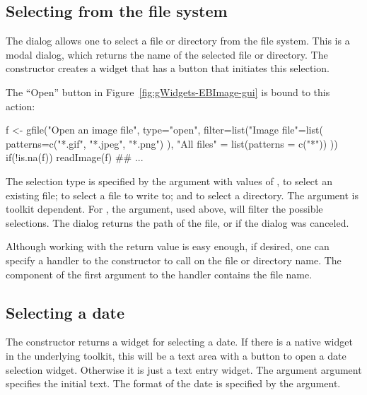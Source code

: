 \subsection{Selecting from the file system}
\label{sec:gWidgets-selecting-from-file}

The  dialog allows one to select a file or directory
from the file system. This is a modal dialog, which returns the name
of the selected file or directory. The 
constructor creates a widget that has a button that
initiates this selection.  

The ``Open'' button in Figure~\ref{fig:gWidgets-EBImage-gui} is bound
to this action:


\begin{Schunk}
\begin{Sinput}
 f <- gfile("Open an image file",
            type="open",
            filter=list("Image file"=list(
                          patterns=c("*.gif", "*.jpeg", "*.png")
                          ),
              "All files" = list(patterns = c("*"))
              ))
 if(!is.na(f)) 
   readImage(f) ## ...
\end{Sinput}
\end{Schunk}


The selection type is specified by the  argument with
values of , to select an existing file;  to
select a file to write to; and  to select a
directory. The  argument is toolkit
dependent. For , the  argument,
used above, will filter the possible selections. The dialog returns
the path of the file, or  if the dialog was canceled.

Although working with the return value is easy enough, if desired, one can specify a
handler to the constructor to call on the file or directory name. The
component  of the first argument to the handler contains
the file name.




\subsection{Selecting a date}
\label{sec:gWidgets-selecting-date}

The  constructor returns a widget for selecting
a date. If there is a native widget in the underlying toolkit, this
will be a text area with a button to open a date selection
widget. Otherwise it is just a text entry widget.  The argument
 argument specifies the initial text. The
format of the date is specified by the 
argument.

